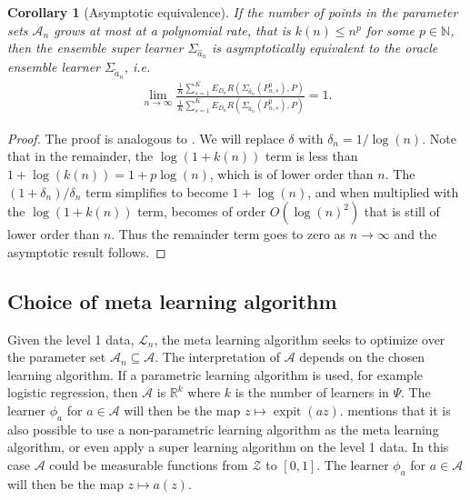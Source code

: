 \documentclass[11pt, a4paper]{article}
\newtheorem{corollary}[theorem]{Corollary}
\theoremstyle{definition}
\theoremstyle{remark}
\newcommand{\ml}{k}
\newcommand{\lib}{\Psi}
\newcommand{\lone}{\mathcal{L}}
\newcommand{\meta}{\phi}
\newcommand{\esl}{\Sigma}
\DeclareMathOperator{\expit}{expit}
\begin{document}
\begin{corollary}[Asymptotic equivalence] \label{cor:esl_asymptotic_equivalence}
    If the number of points in the parameter sets $ \mathcal{A}_n $ grows at most at a polynomial rate, that is $ k(n) \leq n^{p} $ for some $ p \in \mathbb{N} $, then the ensemble super learner $ \esl_{ \hat{a}_n } $ is asymptotically equivalent to the oracle ensemble learner $ \esl_{ \tilde{a}_n } $, i.e.
    \begin{align*}
        \lim_{n \to \infty} \frac{\frac{1}{K} \sum_{s = 1}^{K} E_{D_n} R(\esl_{ \hat{a}_n }(P_{n, s}^{0}) , P)}{\frac{1}{K} \sum_{s = 1}^{K} E_{D_n} R(\esl_{ \tilde{a}_n }(P_{n,s}^{0}), P)} = 1.
    \end{align*}
\end{corollary}
\begin{proof}
    The proof is analogous to . We will replace $ \delta $ with $ \delta_n = 1/ \log(n) $. Note that in the remainder, the $ \log(1 + k(n)) $ term is less than $ 1 + \log(k(n)) = 1 + p \log(n) $, which is of lower order than $ n $. The $(1 + \delta_n)/ \delta_n $ term simplifies to become $ 1 + \log(n) $, and when multiplied with the $ \log(1 + k(n)) $ term, becomes of order $ O(\log(n)^2) $ that is still of lower order than $ n $. Thus the remainder term goes to zero as $ n \to \infty $ and the asymptotic result follows. 
\end{proof}

\subsection{Choice of meta learning algorithm} \label{simplex}
Given the level 1 data, $ \lone_n $, the meta learning algorithm seeks to optimize over the parameter set $ \mathcal{A}_n \subseteq \mathcal{A} $. The interpretation of $ \mathcal{A} $ depends on the chosen learning algorithm. If a parametric learning algorithm is used, for example logistic regression, then $ \mathcal{A} $ is $ \mathbb{R}^{\ml} $ where $ \ml $ is the number of learners in $ \lib $. The learner $ \meta_a $ for $ a \in \mathcal{A} $ will then be the map $ z \mapsto \expit(az) $.
\citet{van2007super} mentions that it is also possible to use a non-parametric learning algorithm as the meta learning algorithm, or even apply a super learning algorithm on the level 1 data. In this case $ \mathcal{A} $ could be measurable functions from $ \mathcal{Z} $ to $ [0, 1] $. The learner $ \meta_a $ for $ a \in \mathcal{A} $ will then be the map $ z \mapsto a(z) $.
\end{document}
